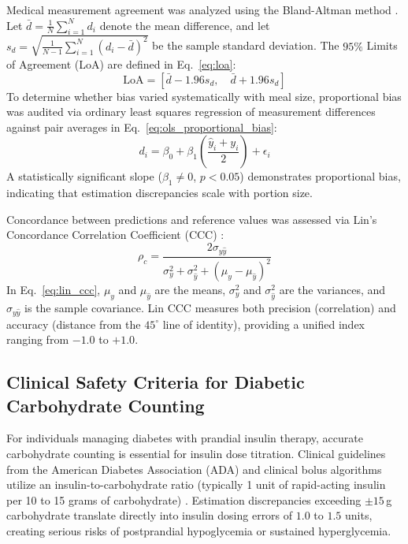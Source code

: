 \documentclass[utf8]{FrontiersinVancouver}
\begin{document}
Medical measurement agreement was analyzed using the Bland-Altman method \citep{Bland1986BlandAltman}. Let $\bar{d} = \frac{1}{N}\sum_{i=1}^N d_i$ denote the mean difference, and let $s_d = \sqrt{\frac{1}{N-1}\sum_{i=1}^N (d_i - \bar{d})^2}$ be the sample standard deviation. The $95\%$ Limits of Agreement (LoA) are defined in Eq.~\ref{eq:loa}:
\begin{equation}
    \label{eq:loa}
    \text{LoA} = \left[ \bar{d} - 1.96 s_d, \quad \bar{d} + 1.96 s_d \right]
\end{equation}
To determine whether bias varied systematically with meal size, proportional bias was audited via ordinary least squares regression of measurement differences against pair averages in Eq.~\ref{eq:ols_proportional_bias}:
\begin{equation}
    \label{eq:ols_proportional_bias}
    d_i = \beta_0 + \beta_1 \left( \frac{\hat{y}_i + y_i}{2} \right) + \epsilon_i
\end{equation}
A statistically significant slope ($\beta_1 \ne 0$, $p < 0.05$) demonstrates proportional bias, indicating that estimation discrepancies scale with portion size.

Concordance between predictions and reference values was assessed via Lin's Concordance Correlation Coefficient (CCC) \citep{Lin1989CCC}:
\begin{equation}
    \label{eq:lin_ccc}
    \rho_c = \frac{2 \sigma_{y\hat{y}}}{\sigma_y^2 + \sigma_{\hat{y}}^2 + \left( \mu_y - \mu_{\hat{y}} \right)^2}
\end{equation}
In Eq.~\ref{eq:lin_ccc}, $\mu_y$ and $\mu_{\hat{y}}$ are the means, $\sigma_y^2$ and $\sigma_{\hat{y}}^2$ are the variances, and $\sigma_{y\hat{y}}$ is the sample covariance. Lin CCC measures both precision (correlation) and accuracy (distance from the $45^\circ$ line of identity), providing a unified index ranging from $-1.0$ to $+1.0$.

\subsection{Clinical Safety Criteria for Diabetic Carbohydrate Counting}

For individuals managing diabetes with prandial insulin therapy, accurate carbohydrate counting is essential for insulin dose titration. Clinical guidelines from the American Diabetes Association (ADA) and clinical bolus algorithms utilize an insulin-to-carbohydrate ratio (typically 1 unit of rapid-acting insulin per 10 to 15 grams of carbohydrate) \citep{ADA2025CarbCounting,Bell2015CarbInsulin}. Estimation discrepancies exceeding $\pm 15$\,g carbohydrate translate directly into insulin dosing errors of $1.0$ to $1.5$ units, creating serious risks of postprandial hypoglycemia or sustained hyperglycemia.
\end{document}
